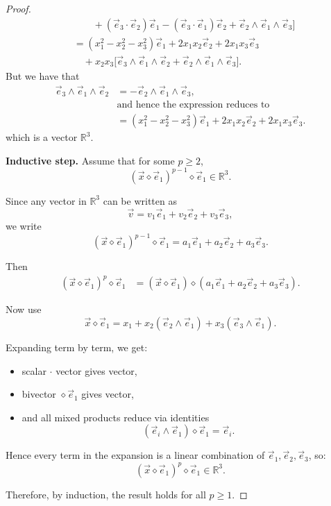 \documentclass{amsart}
\theoremstyle{plain}
\numberwithin{equation}{section}
\begin{document}
\begin{proof}
\begin{align*}
&\qquad + \left( \vec{e}_{3}\cdot \vec{e}_{2} \right)\vec{e}_{1}
- \left( \vec{e}_{3}\cdot \vec{e}_{1} \right)\vec{e}_{2}
+ \vec{e}_{2}\wedge \vec{e}_{1}\wedge \vec{e}_{3}
\Big] \\[8pt]
&= \left( x_{1}^{2}-x_{2}^{2}-x_{3}^{2} \right)\vec{e}_{1}
+ 2x_{1}x_{2}\vec{e}_{2}
+ 2x_{1}x_{3}\vec{e}_{3} \\[6pt]
&\quad + x_{2}x_{3}
\Big[
\vec{e}_{3}\wedge \vec{e}_{1}\wedge \vec{e}_{2}
+ \vec{e}_{2}\wedge \vec{e}_{1}\wedge \vec{e}_{3}
\Big].
\end{align*}
But we have that
\begin{align*}
\vec{e}_{3} \wedge \vec{e}_{1} \wedge \vec{e}_{2}
&= - \vec{e}_{2} \wedge \vec{e}_{1} \wedge \vec{e}_{3}, \\[6pt]
&\text{and hence the expression reduces to } \\[6pt]
&= \left( x_{1}^{2}-x_{2}^{2}-x_{3}^{2} \right)\vec{e}_{1}
+ 2x_{1}x_{2}\vec{e}_{2}
+ 2x_{1}x_{3}\vec{e}_{3}.
\end{align*}
which is a vector $\mathbb{R}^3$.


\textbf{Inductive step.}
Assume that for some $p\ge 2$,
\[
(\vec x\diamond \vec e_1)^{p-1}\diamond \vec e_1 \in \mathbb{R}^3.
\]

Since any vector in $\mathbb{R}^3$ can be written as
\[
\vec v = v_1\vec e_1 + v_2\vec e_2 + v_3\vec e_3,
\]
we write
\[
(\vec x\diamond \vec e_1)^{p-1}\diamond \vec e_1
=
a_1\vec e_1 + a_2\vec e_2 + a_3\vec e_3.
\]

Then
\begin{align*}
(\vec x\diamond \vec e_1)^p\diamond \vec e_1
&=
(\vec x\diamond \vec e_1)\diamond (a_1\vec e_1 + a_2\vec e_2 + a_3\vec e_3).
\end{align*}

Now use
\[
\vec x\diamond \vec e_1
=
x_1 + x_2(\vec e_2\wedge \vec e_1) + x_3(\vec e_3\wedge \vec e_1).
\]

Expanding term by term, we get:
\begin{itemize}
\item  scalar $\cdot$ vector gives vector,
\item  bivector $\diamond \vec e_1$ gives vector,
\item  and all mixed products reduce via identities
\[
(\vec e_i\wedge \vec e_1)\diamond \vec e_1 = \vec e_i.
\]
\end{itemize}
Hence every term in the expansion is a linear combination of
$\vec e_1,\vec e_2,\vec e_3$, so:
\[
(\vec x\diamond \vec e_1)^p\diamond \vec e_1 \in \mathbb{R}^3.
\]

Therefore, by induction, the result holds for all $p\ge 1$.
\end{proof}
\end{document}
